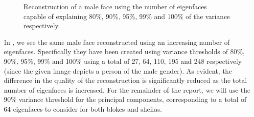 \begin{figure}[ht!]
\begin{minipage}{0.19\textwidth}
    \end{minipage}
    \caption{Reconstruction of a male face using the number of eigenfaces capable of explaining 80\%, 90\%, 95\%, 99\% and 100\% of the variance respectively.}
    \label{fig:petyr}
\end{figure}

In , we see the same male face reconstructed using an increasing number of eigenfaces. Specifically they have been created using variance thresholds of 80\%, 90\%, 95\%, 99\% and 100\% using a total of 27, 64, 110, 195 and 248 respectively (since the given image depicts a person of the male gender). As evident, the difference in the quality of the reconstruction is significantly reduced as the total number of eigenfaces is increased. For the remainder of the report, we will use the 90\% variance threshold for the principal components, corresponding to a total of 64 eigenfaces to consider for both blokes and sheilas.

